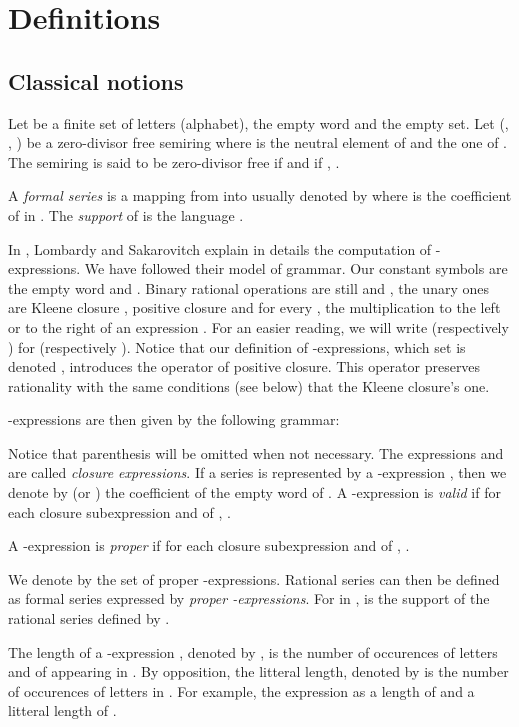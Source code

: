 \documentclass[11pt]{article}
\begin{document}
\section{Definitions}
\subsection{Classical notions}
Let  be a finite set of letters (alphabet),  the empty word
and  the empty set.
Let (, , ) be a  zero-divisor free semiring where
 is the neutral element of
 and  the one of .  The semiring 
is said to be zero-divisor free \cite{HW96} if  and if , .

A {\it formal series} \cite{BR88} is a mapping 
from  into  usually denoted by  where  is the
coefficient of  in . The {\it support} of  is the language .


In \cite{LS01}, Lombardy and Sakarovitch explain in details the computation of
- expressions. We have followed their model of grammar. Our constant symbols
are  the empty word and . Binary rational operations are still  and
, the unary ones are Kleene closure , positive closure  and for
every , the multiplication to the left or to the right of an
expression . For an easier reading, we will write  (respectively ) for  (respectively 
). Notice that our definition of -expressions, which set is denoted
, introduces the operator of positive closure. This operator preserves
rationality with the same conditions (see below) that the Kleene closure's one.

-expressions are then given by the following grammar:


Notice that parenthesis will be omitted when not necessary. The expressions  and  are called {\it closure expressions}.
If a series  is represented by a -expression , then we denote by  (or ) the coefficient of the empty word of .
A -expression  is {\it valid} \cite{Sak03} if for each closure subexpression  and  of , .
 
 A -expression  is {\it proper} if for each closure subexpression  and  of , .


We denote by  the set of proper -expressions. Rational series
can then be defined as formal series expressed by {\it proper -expressions}.
For  in ,  is the support of the rational series
defined by .

The length of a -expression , denoted by , is the number of occurences of letters and of  
appearing in . By opposition, the litteral length, denoted by  is the number of occurences of letters in .
 For example, the expression   as a length of  and a litteral length of .
\end{document}
